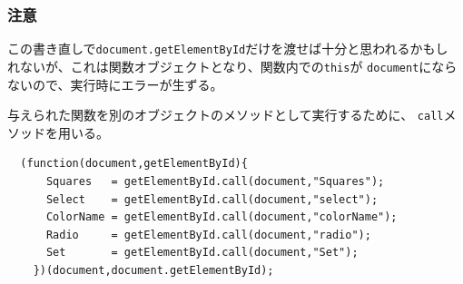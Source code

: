 \documentclass[dvipsk]{beamer}
\begin{document}
 \begin{frame}[containsverbatim]
\frametitle{注意}
この書き直しで\texttt{document.getElementById}だけを渡せば十分と思われるかもし
 れないが、これは関数オブジェクトとなり、関数内での\texttt{this}が
  \texttt{document}にならないので、実行時にエラーが生ずる。

与えられた関数を別のオブジェクトのメソッドとして実行するために、
  \texttt{call}メソッドを用いる。
\begin{verbatim}
  (function(document,getElementById){
      Squares   = getElementById.call(document,"Squares");
      Select    = getElementById.call(document,"select");
      ColorName = getElementById.call(document,"colorName");
      Radio     = getElementById.call(document,"radio");
      Set       = getElementById.call(document,"Set");
	})(document,document.getElementById);
\end{verbatim}
 \end{frame}
\end{document}
